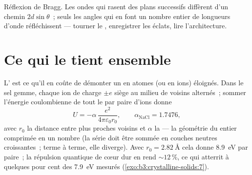 \begin{omfigure}

{\small Réflexion de Bragg. Les ondes qui rasent des plans successifs
diffèrent d'un chemin $2d\sin\theta$~; seuls les angles qui en font un
nombre entier de longueurs d'onde réfléchissent --- tourner le
, enregistrer les éclats, lire l'architecture.}
\end{omfigure}

\section{Ce qui le tient ensemble}

\begin{proposition}\label{prop:b3:crystalline-solids:madelung}
L'\emph{} est ce qu'il en coûte de démonter un
 en atomes (ou en ions) éloignés. Dans le sel gemme, chaque ion
de charge $\pm e$ siège au milieu de voisins alternés~; sommer
l'énergie coulombienne de tout le  par paire d'ions donne
\[
U = -\alpha\,\frac{e^2}{4\pi\varepsilon_0 r_0} ,
\qquad \alpha_{\text{NaCl}} = 1.7476 ,
\]
avec $r_0$ la distance entre plus proches voisins et $\alpha$ la
\emph{} --- la géométrie du  entier
comprimée en un nombre (la série doit être sommée en couches neutres
croissantes~; terme à terme, elle diverge). Avec $r_0 =
\qty{2.82}{\angstrom}$ cela donne \qty{8.9}{eV} par paire~; la
répulsion quantique de cœur dur en rend $\sim12\,\%$, ce qui atterrit
à quelques pour cent des \qty{7.9}{eV} mesurés
(\cref{exo:b3:crystalline-solids:7}).
\end{proposition}
\admitted

